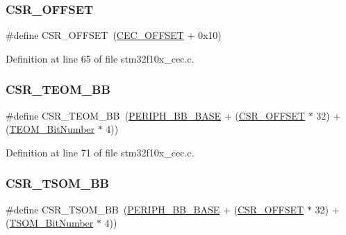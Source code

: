 \subsubsection{\texorpdfstring{C\+S\+R\+\_\+\+O\+F\+F\+S\+ET}{CSR\_OFFSET}}
{\footnotesize\ttfamily \#define C\+S\+R\+\_\+\+O\+F\+F\+S\+ET~(\hyperlink{group___c_e_c___private___defines_ga675324bd8967b75f32554f50210821af}{C\+E\+C\+\_\+\+O\+F\+F\+S\+ET} + 0x10)}



Definition at line 65 of file stm32f10x\+\_\+cec.\+c.

\mbox{\label{group___c_e_c___private___defines_ga9ac493d98ce1f6d82b778ace0f2bc7bb}} 
\subsubsection{\texorpdfstring{C\+S\+R\+\_\+\+T\+E\+O\+M\+\_\+\+BB}{CSR\_TEOM\_BB}}
{\footnotesize\ttfamily \#define C\+S\+R\+\_\+\+T\+E\+O\+M\+\_\+\+BB~(\hyperlink{group___peripheral__memory__map_gaed7efc100877000845c236ccdc9e144a}{P\+E\+R\+I\+P\+H\+\_\+\+B\+B\+\_\+\+B\+A\+SE} + (\hyperlink{group___r_c_c___private___defines_ga984cbe73312b6d3d355c5053763d499a}{C\+S\+R\+\_\+\+O\+F\+F\+S\+ET} $\ast$ 32) + (\hyperlink{group___c_e_c___private___defines_gac86378eff7728e5cfca5480ab2dbef0b}{T\+E\+O\+M\+\_\+\+Bit\+Number} $\ast$ 4))}



Definition at line 71 of file stm32f10x\+\_\+cec.\+c.

\mbox{\label{group___c_e_c___private___defines_ga4971cc50b0ead4a493e2a9c03966c826}} 
\subsubsection{\texorpdfstring{C\+S\+R\+\_\+\+T\+S\+O\+M\+\_\+\+BB}{CSR\_TSOM\_BB}}
{\footnotesize\ttfamily \#define C\+S\+R\+\_\+\+T\+S\+O\+M\+\_\+\+BB~(\hyperlink{group___peripheral__memory__map_gaed7efc100877000845c236ccdc9e144a}{P\+E\+R\+I\+P\+H\+\_\+\+B\+B\+\_\+\+B\+A\+SE} + (\hyperlink{group___r_c_c___private___defines_ga984cbe73312b6d3d355c5053763d499a}{C\+S\+R\+\_\+\+O\+F\+F\+S\+ET} $\ast$ 32) + (\hyperlink{group___c_e_c___private___defines_ga1a470abab836eba7b451950938708946}{T\+S\+O\+M\+\_\+\+Bit\+Number} $\ast$ 4))}



